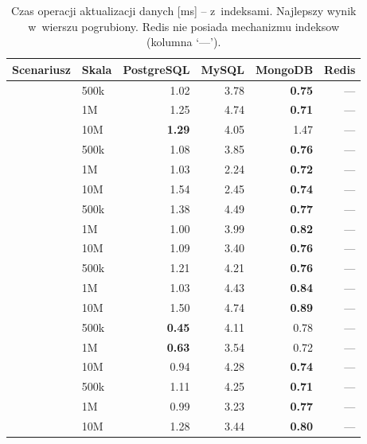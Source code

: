 \begin{table}[H]
\centering
\caption{Czas operacji aktualizacji danych [ms] -- z~indeksami. Najlepszy wynik w~wierszu pogrubiony. Redis nie posiada mechanizmu indeksow (kolumna `---').}
\label{tab:update_idx}
\small
\begin{tabular}{@{}llrrrr@{}}
\toprule
\textbf{Scenariusz} & \textbf{Skala} & \textbf{PostgreSQL} & \textbf{MySQL} & \textbf{MongoDB} & \textbf{Redis} \\
\midrule
{}
 & 500k & 1.02 & 3.78 & \textbf{0.75} & --- \\
 & 1M & 1.25 & 4.74 & \textbf{0.71} & --- \\
 & 10M & \textbf{1.29} & 4.05 & 1.47 & --- \\
\midrule
{}
 & 500k & 1.08 & 3.85 & \textbf{0.76} & --- \\
 & 1M & 1.03 & 2.24 & \textbf{0.72} & --- \\
 & 10M & 1.54 & 2.45 & \textbf{0.74} & --- \\
\midrule
{}
 & 500k & 1.38 & 4.49 & \textbf{0.77} & --- \\
 & 1M & 1.00 & 3.99 & \textbf{0.82} & --- \\
 & 10M & 1.09 & 3.40 & \textbf{0.76} & --- \\
\midrule
{}
 & 500k & 1.21 & 4.21 & \textbf{0.76} & --- \\
 & 1M & 1.03 & 4.43 & \textbf{0.84} & --- \\
 & 10M & 1.50 & 4.74 & \textbf{0.89} & --- \\
\midrule
{}
 & 500k & \textbf{0.45} & 4.11 & 0.78 & --- \\
 & 1M & \textbf{0.63} & 3.54 & 0.72 & --- \\
 & 10M & 0.94 & 4.28 & \textbf{0.74} & --- \\
\midrule
{}
 & 500k & 1.11 & 4.25 & \textbf{0.71} & --- \\
 & 1M & 0.99 & 3.23 & \textbf{0.77} & --- \\
 & 10M & 1.28 & 3.44 & \textbf{0.80} & --- \\
\bottomrule
\end{tabular}
\end{table}
